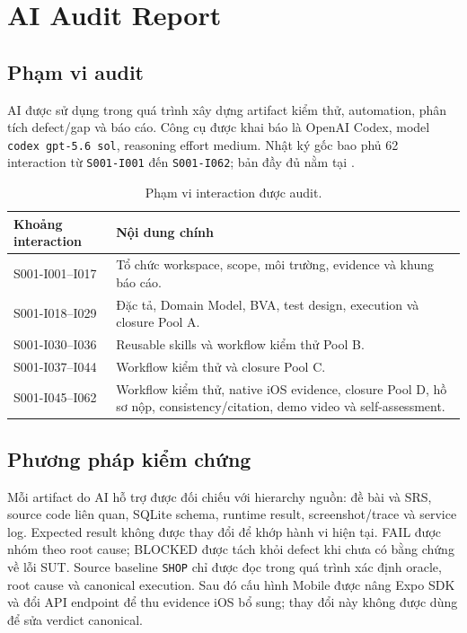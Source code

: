 \chapter{AI Audit Report}

\section{Phạm vi audit}

AI được sử dụng trong quá trình xây dựng artifact kiểm thử, automation, phân tích
defect/gap và báo cáo. Công cụ được khai báo là OpenAI Codex, model
\texttt{codex gpt-5.6 sol}, reasoning effort medium. Nhật ký gốc bao phủ 62
interaction từ \texttt{S001-I001} đến \texttt{S001-I062}; bản đầy đủ nằm tại
.

\begin{table}[H]
  \centering
  \small
  \begin{tabular}{lp{8.7cm}}
    \toprule
    Khoảng interaction & Nội dung chính \\
    \midrule
    S001-I001--I017 & Tổ chức workspace, scope, môi trường, evidence và khung báo cáo. \\
    S001-I018--I029 & Đặc tả, Domain Model, BVA, test design, execution và closure Pool A. \\
    S001-I030--I036 & Reusable skills và workflow kiểm thử Pool B. \\
    S001-I037--I044 & Workflow kiểm thử và closure Pool C. \\
    S001-I045--I062 & Workflow kiểm thử, native iOS evidence, closure Pool D, hồ sơ nộp, consistency/citation, demo video và self-assessment. \\
    \bottomrule
  \end{tabular}
  \caption{Phạm vi interaction được audit.}
  \label{tab:ai-audit-ranges}
\end{table}

\section{Phương pháp kiểm chứng}

Mỗi artifact do AI hỗ trợ được đối chiếu với hierarchy nguồn: đề bài và SRS,
source code liên quan, SQLite schema, runtime result, screenshot/trace và service
log. Expected result không được thay đổi để khớp hành vi hiện tại. FAIL được nhóm
theo root cause; BLOCKED được tách khỏi defect khi chưa có bằng chứng về lỗi SUT.
Source baseline \texttt{SHOP} chỉ được đọc trong quá trình xác định oracle,
root cause và canonical execution. Sau đó cấu hình Mobile được nâng Expo SDK và
đổi API endpoint để thu evidence iOS bổ sung; thay đổi này không được dùng để
sửa verdict canonical.

